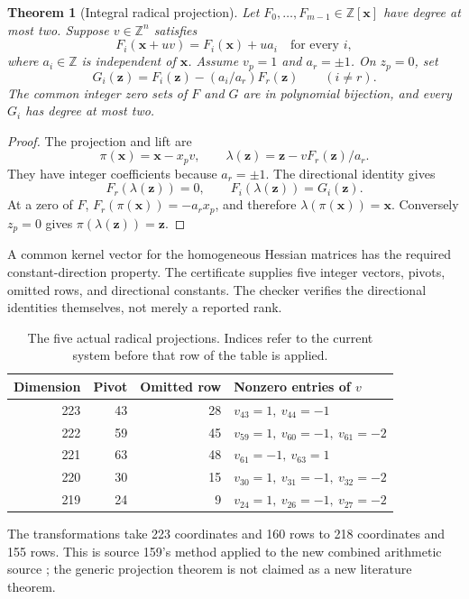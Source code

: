 \documentclass[11pt,letterpaper]{article}
\newtheorem{theorem}{Theorem}[section]
\theoremstyle{remark}
\newcommand{\Z}{\mathbb Z}
\begin{document}
\begin{theorem}[Integral radical projection]\label{thm:radical}
Let \(F_0,\ldots,F_{m-1}\in\Z[\mathbf{x}]\) have degree at most two.
Suppose \(v\in\Z^n\) satisfies
\[
 F_i(\mathbf{x}+uv)=F_i(\mathbf{x})+u a_i
 \quad\text{for every }i,
\]
where \(a_i\in\Z\) is independent of \(\mathbf{x}\).
Assume \(v_p=1\) and \(a_r=\pm1\).
On \(z_p=0\), set
\[
 G_i(\mathbf{z})=F_i(\mathbf{z})-(a_i/a_r)F_r(\mathbf{z})
 \qquad(i\ne r).
\]
The common integer zero sets of \(F\) and \(G\) are in polynomial
bijection, and every \(G_i\) has degree at most two.
\end{theorem}
\begin{proof}
The projection and lift are
\[
 \pi(\mathbf{x})=\mathbf{x}-x_pv,\qquad
 \lambda(\mathbf{z})=\mathbf{z}-vF_r(\mathbf{z})/a_r.
\]
They have integer coefficients because \(a_r=\pm1\).
The directional identity gives
\[
 F_r(\lambda(\mathbf{z}))=0,\qquad
 F_i(\lambda(\mathbf{z}))=G_i(\mathbf{z}).
\]
At a zero of \(F\),
\(F_r(\pi(\mathbf{x}))=-a_rx_p\), and therefore
\(\lambda(\pi(\mathbf{x}))=\mathbf{x}\).
Conversely \(z_p=0\) gives
\(\pi(\lambda(\mathbf{z}))=\mathbf{z}\).
\end{proof}

A common kernel vector for the homogeneous Hessian matrices has
the required constant-direction property. The certificate supplies
five integer vectors, pivots, omitted rows, and directional
constants. The checker verifies the directional identities
themselves, not merely a reported rank.

\begin{table}[ht]
\centering\small
\begin{tabular}{rrrl}
\toprule
Dimension& Pivot & Omitted row & Nonzero entries of \(v\)\\
\midrule
223&43&28&\(v_{43}=1,\ v_{44}=-1\)\\
222&59&45&\(v_{59}=1,\ v_{60}=-1,\ v_{61}=-2\)\\
221&63&48&\(v_{61}=-1,\ v_{63}=1\)\\
220&30&15&\(v_{30}=1,\ v_{31}=-1,\ v_{32}=-2\)\\
219&24&9 &\(v_{24}=1,\ v_{26}=-1,\ v_{27}=-2\)\\
\bottomrule
\end{tabular}
\caption{The five actual radical projections. Indices refer to the
current system before that row of the table is applied.}
\label{tab:directions}
\end{table}

The transformations take 223 coordinates and 160 rows to 218
coordinates and 155 rows. This is source 159's method applied to
the new combined arithmetic source \cite{s159}; the generic
projection theorem is not claimed as a new literature theorem.
\end{document}
